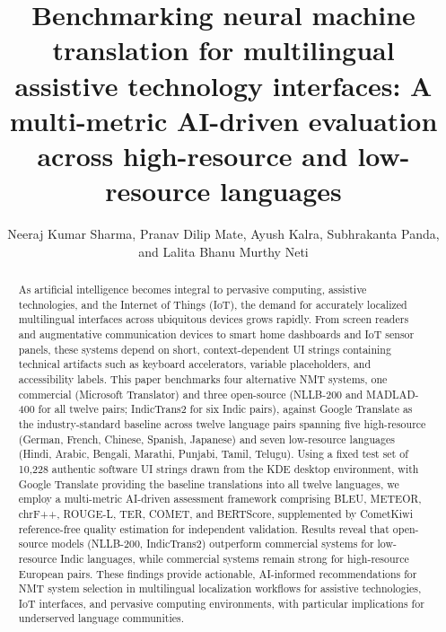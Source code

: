 \documentclass[Afour,sagev,times,doublespace]{sagej}
\begin{document}

\title{Benchmarking neural machine translation for multilingual assistive technology interfaces: A multi-metric AI-driven evaluation across high-resource and low-resource languages}

\author{Neeraj Kumar Sharma, Pranav Dilip Mate, Ayush Kalra, Subhrakanta Panda, and Lalita Bhanu Murthy Neti}




\begin{abstract}
As artificial intelligence becomes integral to pervasive computing, assistive technologies, and the Internet of Things (IoT), the demand for accurately localized multilingual interfaces across ubiquitous devices grows rapidly. From screen readers and augmentative communication devices to smart home dashboards and IoT sensor panels, these systems depend on short, context-dependent UI strings containing technical artifacts such as keyboard accelerators, variable placeholders, and accessibility labels. This paper benchmarks four alternative NMT systems, one commercial (Microsoft Translator) and three open-source (NLLB-200 and MADLAD-400 for all twelve pairs; IndicTrans2 for six Indic pairs), against Google Translate as the industry-standard baseline across twelve language pairs spanning five high-resource (German, French, Chinese, Spanish, Japanese) and seven low-resource languages (Hindi, Arabic, Bengali, Marathi, Punjabi, Tamil, Telugu). Using a fixed test set of 10,228 authentic software UI strings drawn from the KDE desktop environment, with Google Translate providing the baseline translations into all twelve languages, we employ a multi-metric AI-driven assessment framework comprising BLEU, METEOR, chrF++, ROUGE-L, TER, COMET, and BERTScore, supplemented by CometKiwi reference-free quality estimation for independent validation. Results reveal that open-source models (NLLB-200, IndicTrans2) outperform commercial systems for low-resource Indic languages, while commercial systems remain strong for high-resource European pairs. These findings provide actionable, AI-informed recommendations for NMT system selection in multilingual localization workflows for assistive technologies, IoT interfaces, and pervasive computing environments, with particular implications for underserved language communities.
\end{abstract}
\end{document}
